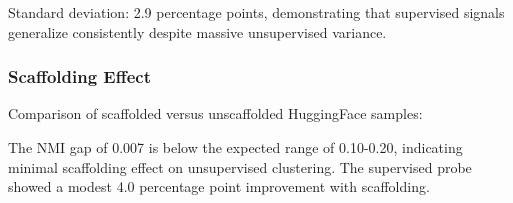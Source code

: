 Standard deviation: 2.9 percentage points, demonstrating that supervised signals generalize consistently despite massive unsupervised variance.

\subsubsection{Scaffolding Effect}

Comparison of scaffolded versus unscaffolded HuggingFace samples:

\begin{table}[htbp]
\centering
{}
\end{table}

The NMI gap of 0.007 is below the expected range of 0.10-0.20, indicating minimal scaffolding effect on unsupervised clustering. The supervised probe showed a modest 4.0 percentage point improvement with scaffolding.

